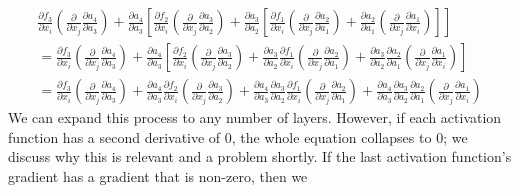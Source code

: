 \begin{multline*}
     \frac{\partial f_3}{\partial x_i}  \left( \frac{\partial}{\partial x_j} \frac{\partial a_4}{\partial a_3} \right)       +       \frac{\partial a_4}{\partial a_3}         \left[     
                \frac{\partial f_2}{\partial x_i}  \left( \frac{\partial}{\partial x_j} \frac{\partial a_3}{\partial a_2} \right)       +       \frac{\partial a_3}{\partial a_2}          \left[
                        \frac{\partial f_1}{\partial x_i}  \left( \frac{\partial}{\partial x_j} \frac{\partial a_2}{\partial a_1} \right)       +       \frac{\partial a_2}{\partial a_1} \left( \frac{\partial}{\partial x_j} \frac{\partial a_1}{\partial x_i} \right)
                \right] 
      \right]\\[10pt]
     = \frac{\partial f_3}{\partial x_i}  \left( \frac{\partial}{\partial x_j} \frac{\partial a_4}{\partial a_3} \right)       +       \frac{\partial a_4}{\partial a_3}         \left[     
                \frac{\partial f_2}{\partial x_i}  \left( \frac{\partial}{\partial x_j} \frac{\partial a_3}{\partial a_2} \right)       +
                         \frac{\partial a_3}{\partial a_2} \frac{\partial f_1}{\partial x_i}  \left( \frac{\partial}{\partial x_j} \frac{\partial a_2}{\partial a_1} \right)       +        \frac{\partial a_3}{\partial a_2} \frac{\partial a_2}{\partial a_1} \left( \frac{\partial}{\partial x_j} \frac{\partial a_1}{\partial x_i} \right)
       \right]\\[10pt]
     = \frac{\partial f_3}{\partial x_i}  \left( \frac{\partial}{\partial x_j} \frac{\partial a_4}{\partial a_3} \right)       +    
                \frac{\partial a_4}{\partial a_3} \frac{\partial f_2}{\partial x_i}  \left( \frac{\partial}{\partial x_j} \frac{\partial a_3}{\partial a_2} \right)       +
                         \frac{\partial a_4}{\partial a_3} \frac{\partial a_3}{\partial a_2} \frac{\partial f_1}{\partial x_i}  \left( \frac{\partial}{\partial x_j} \frac{\partial a_2}{\partial a_1} \right)       +
                                \frac{\partial a_4}{\partial a_3} \frac{\partial a_3}{\partial a_2} \frac{\partial a_2}{\partial a_1} \left( \frac{\partial}{\partial x_j} \frac{\partial a_1}{\partial x_i} \right)
\end{multline*}
We can expand this process to any number of layers. However, if each activation function has a
second derivative of $0$, the whole equation collapses to $0$; we discuss why this is relevant and a
problem shortly. If the last activation function's gradient has a gradient that is non-zero, then we
